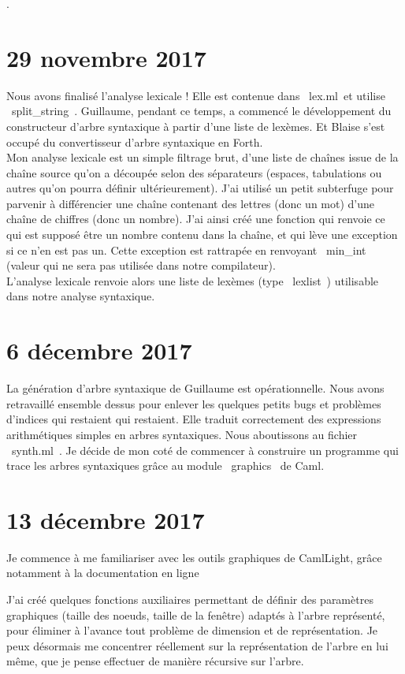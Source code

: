 \documentclass{report}
\begin{document}
.

\section{29 novembre 2017}

Nous avons finalisé l'analyse lexicale ! Elle est contenue dans ~lex.ml~\footnotemark[1] et utilise ~split_string~.
 Guillaume, pendant ce temps, a commencé le développement du constructeur d'arbre syntaxique à partir d'une liste de lexèmes. Et Blaise s'est occupé du convertisseur d'arbre syntaxique en Forth.\\
Mon analyse lexicale est un simple filtrage brut, d'une liste de chaînes issue de la chaîne source qu'on a découpée selon des séparateurs (espaces, tabulations ou autres qu'on pourra définir ultérieurement).
J'ai utilisé un petit subterfuge pour parvenir à différencier une chaîne contenant des lettres (donc un mot) d'une chaîne de chiffres (donc un nombre).
J'ai ainsi créé une fonction qui renvoie ce qui est supposé être un nombre contenu dans la chaîne, et qui lève une exception si ce n'en est pas un. Cette exception est rattrapée en renvoyant ~min_int~ (valeur qui ne sera pas utilisée dans notre compilateur). \\
L'analyse lexicale renvoie alors une liste de lexèmes (type ~lexlist~) utilisable dans notre analyse syntaxique.

\section{6 décembre 2017}
La génération d'arbre syntaxique de Guillaume est opérationnelle. Nous avons retravaillé ensemble dessus pour enlever les quelques petits bugs et problèmes d'indices qui restaient qui restaient. Elle traduit correctement des expressions arithmétiques simples en arbres syntaxiques. Nous aboutissons au fichier ~synth.ml~\footnotemark[1].
Je décide de mon coté de commencer à construire un programme qui trace les arbres syntaxiques grâce au module ~graphics~ de Caml. 

\section{13 décembre 2017}
Je commence à me familiariser avec les outils graphiques de CamlLight, grâce notamment à la documentation en ligne\footnotemark[2]


J'ai créé quelques fonctions auxiliaires permettant de définir des paramètres graphiques (taille des noeuds, taille de la fenêtre) adaptés à l'arbre représenté, pour éliminer à l'avance tout problème de dimension et de représentation.
Je peux désormais me concentrer réellement sur la représentation de l'arbre en lui même, que je pense effectuer de manière récursive sur l'arbre.
\\
\end{document}
